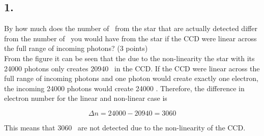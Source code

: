 \documentclass[11pt,a4paper,twoside]{article}
\newcommand{\electron}{\ce{e^-}}
\begin{document}
\subsection*{1.} By how much does the number of \electron \ from the star that are actually detected differ from the number of \electron \ you would have from the star if the CCD were linear across the full range of incoming photons? (3 points) \\

From the figure it can be seen that the due to the non-linearity the star with its \num{24000} photons only creates \num{20940} \electron \ in the CCD. If the CCD were linear across the full range of incoming photons and one photon would create exactly one electron, the incoming \num{24000} photons would create \num{24000} \electron. Therefore, the difference in electron number for the linear and non-linear case is 

\begin{equation}
 \Delta n = \num{24000} - \num{20940} = \num{3060}
\end{equation}

This means that \num{3060} \electron \ are not detected due to the non-linearity of the CCD. 
\end{document}
